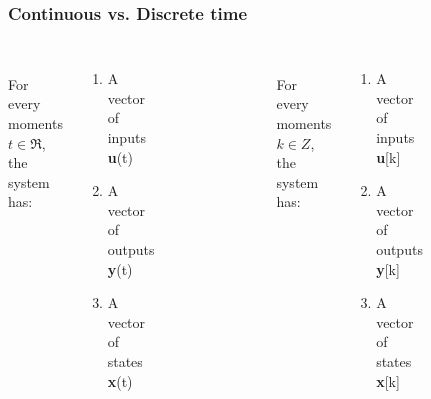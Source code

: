 \documentclass{beamer}
\begin{document}
\begin{frame}
\frametitle{Continuous vs. Discrete time}
\begin{columns}[c] 

\\
For every moments $t \in \Re$, the system has: 
\begin{enumerate}
\item A vector of inputs \textbf{u}(t)
\item A vector of outputs \textbf{y}(t)
\item A vector of states \textbf{x}(t)
\end{enumerate}
\begin{figure}
\includegraphics[width=0.8\linewidth]{continuous}
\end{figure}

\\
For every moments $k \in Z$, the system has: 
\begin{enumerate}
\item A vector of inputs \textbf{u}[k]
\item A vector of outputs \textbf{y}[k]
\item A vector of states \textbf{x}[k]
\end{enumerate}
\begin{figure}
\includegraphics[width=0.8\linewidth]{discrete}
\end{figure}

\end{columns}
\end{frame}
\end{document}
